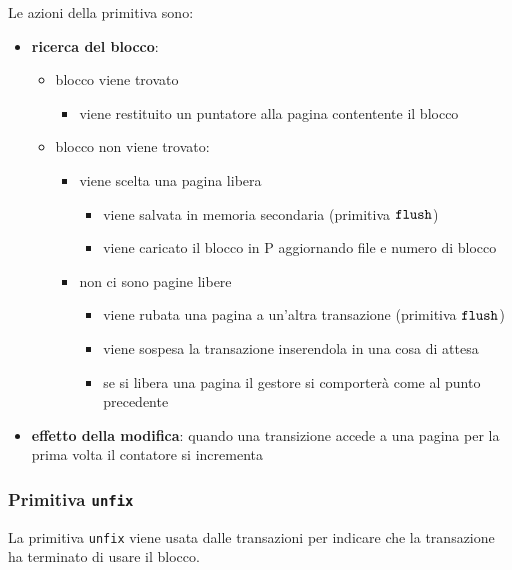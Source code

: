Le azioni della primitiva sono:
\begin{itemize}[label=$\triangleright$, itemsep=\medskipamount]
  \item \textbf{ricerca del blocco}:
  \begin{itemize}[label=$\diamond$, itemsep=\medskipamount]
    \item blocco viene trovato
    \begin{itemize}[label=$\Rightarrow$, itemsep=\smallskipamount]
      \item viene restituito un puntatore alla pagina contentente il blocco
    \end{itemize}
    \item blocco non viene trovato:
    \begin{itemize}[label=$\circ$, itemsep=\smallskipamount]
      \item viene scelta una pagina libera
      \begin{itemize}[label=$\Rightarrow$, itemsep=\smallskipamount]
        \item viene salvata in memoria secondaria (primitiva $\verb|flush|$)
        \item viene caricato il blocco in P aggiornando file e numero di blocco
      \end{itemize}
      \item non ci sono pagine libere
      \begin{itemize}[label=$\Rightarrow$, itemsep=\smallskipamount]
        \item viene rubata una pagina a un'altra transazione (primitiva $\verb|flush|$)
        \item viene sospesa la transazione inserendola in una cosa di attesa
        \item se si libera una pagina il gestore si comporterà come al punto precedente
      \end{itemize}
    \end{itemize}
  \end{itemize}
\end{itemize}
\medskip
\begin{itemize}[label=$\Rightarrow$]
  \item \textbf{effetto della modifica}: quando una transizione accede a una pagina per la prima volta il contatore si incrementa
\end{itemize}

\subsubsection{Primitiva \protect\texttt{unfix}}
La \textcolor{azzurrino}{primitiva \texttt{unfix}} viene usata dalle transazioni per indicare che la transazione ha terminato di usare il blocco.

